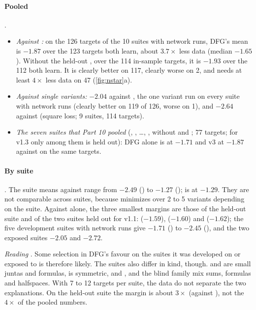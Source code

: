 \paragraph{Pooled} .
\begin{itemize}
\item \emph{Against :} on the 126 targets of the 10 suites with network runs, DFG's mean is $-1.87$ over the 123 targets both learn, about $3.7\times$ less data (median $-1.65$). Without the held-out , over the 114 in-sample targets, it is $-1.93$ over the 112 both learn. It is clearly better on 117, clearly worse on 2, and needs at least $4\times$ less data on 47 (\cref{fig:nstar}a).
\item \emph{Against single variants:} $-2.04$ against , the one variant run on every suite with network runs (clearly better on 119 of 126, worse on 1), and $-2.64$ against  (square loss; 9 suites, 114 targets).
\item \emph{The seven  suites that Part 10 pooled} (, , \dots, , without  and ; 77 targets; for v1.3 only  among them is held out): DFG alone is at $-1.71$ and v3 at $-1.87$ against  on the same targets.
\end{itemize}

\paragraph{By suite} . The suite means against  range from $-2.49$ () to $-1.27$ ();  is at $-1.29$. They are not comparable across suites, because  minimizes over 2 to 5 variants depending on the suite. Against  alone, the three smallest margins are those of the held-out suite and of the two suites held out for v1.1:  ($-1.59$),  ($-1.60$) and  ($-1.62$); the five development suites with network runs give $-1.71$ () to $-2.45$ (), and the two exposed suites $-2.05$ and $-2.72$.

\emph{Reading} . Some selection in DFG's favour on the suites it was developed on or exposed to is therefore likely. The suites also differ in kind, though.  and  are small juntas and formulas,  is symmetric, and ,  and the blind family mix sums, formulas and halfspaces. With 7 to 12 targets per suite, the data do not separate the two explanations. On the held-out suite the margin is about $3\times$ (against ), not the $4\times$ of the pooled numbers.

